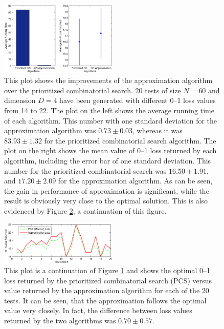 \begin{figure}[here]
\includegraphics[width=0.50\textwidth]{images/fig43_approx.eps}
\caption{ This plot shows the improvements of the approximation
  algorithm over the prioritized combinatorial search. 20 tests of
  size $N=60$ and dimension $D=4$ have been generated with different
  0--1 loss values from 14 to 22. The plot on the left shows the
  average running time of each algorithm. This number with one
  standard deviation for the approximation algorithm was $0.73 \pm
  0.03$, whereas it was $83.93 \pm 1.32$ for the prioritized
  combinatorial search algorithm. The plot on the right shows the mean
  value of 0--1 loss returned by each algorithm, including the error
  bar of one standard deviation. This number for the prioritized
  combinatorial search was $16.50\pm 1.91$, and $17.20 \pm 2.09$ for
  the approximation algorithm. As can be seen, the gain in performance
  of approximation is significant, while the result is obviously very
  close to the optimal solution. This is also evidenced by Figure
  \ref{fig:cs_approxlosses}, a continuation of this figure.  }
\label{fig:cs_approx}
\end{figure}

\begin{figure}[here]
\includegraphics[width=0.50\textwidth]{images/fig44_approxlosses.eps}
\caption{ This plot is a continuation of Figure \ref{fig:cs_approx}
  and shows the optimal 0--1 loss returned by the prioritized
  combinatorial search (PCS) versus value returned by the
  approximation algorithm for each of the 20 tests. It can be seen,
  that the approximation follows the optimal value very closely. In
  fact, the difference between loss values returned by the two
  algorithms was $0.70 \pm 0.57$.  }
\label{fig:cs_approxlosses}
\end{figure}

